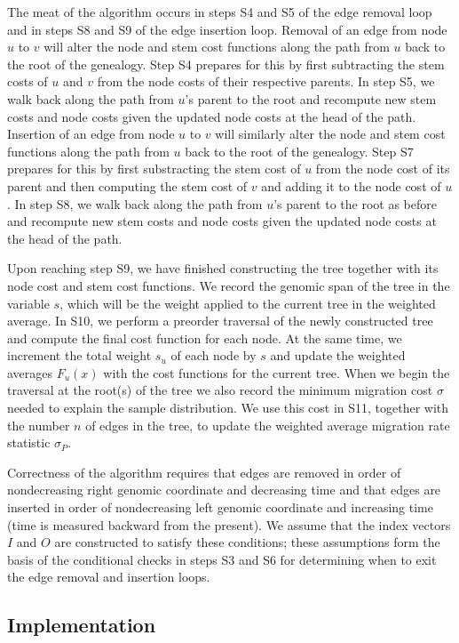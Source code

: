The meat of the algorithm occurs in steps S4 and S5 of the edge removal loop
and in steps S8 and S9 of the edge insertion loop. Removal of an edge from
node $u$ to $v$ will alter the node and stem cost functions along the path from
$u$ back to the root of the genealogy. Step S4 prepares for this by first
subtracting the stem costs of $u$ and $v$ from the node costs of their
respective parents. In step S5, we walk back along the path from $u$'s parent to
the root and recompute new stem costs and node costs given the updated node
costs at the head of the path. Insertion of an edge from node $u$ to $v$ will 
similarly alter the node and stem cost functions along the path from
$u$ back to the root of the genealogy. Step S7 prepares for this by first
substracting the stem cost of $u$ from the node cost of its parent and then
computing the stem cost of $v$ and adding it to the node cost of $u$. In step 
S8, we walk back along the path from $u$'s parent to the root as before and 
recompute new stem costs and node costs given the updated node costs at the 
head of the path.

Upon reaching step S9, we have finished constructing the tree together with its
node cost and stem cost functions. We record the genomic span of the tree in the 
variable $s$, which will be the weight applied to the current tree in the weighted
average. In S10, we perform a preorder traversal of the newly constructed tree
and compute the final cost function for each node. At the same time, we 
increment the total weight $s_u$ of each node by $s$ and update the weighted 
averages $F_u(x)$ with the cost functions for the current tree. When we begin
the traversal at the root(s) of the tree we also record the minimum migration 
cost $\sigma$ needed to explain the sample distribution. We use this cost in
S11, together with the number $n$ of edges in the tree, to update the weighted
average migration rate statistic $\sigma_P$.

Correctness of the algorithm requires that edges are removed in order of 
nondecreasing right genomic coordinate and decreasing time and that edges are
inserted in order of nondecreasing left genomic coordinate and increasing time
(time is measured backward from the present). We assume that the index vectors
$I$ and $O$ are constructed to satisfy these conditions; these assumptions 
form the basis of the conditional checks in steps S3 and S6 for determining
when to exit the edge removal and insertion loops.

\subsection{Implementation}

